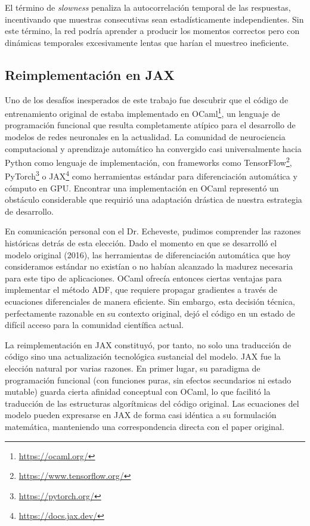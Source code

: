 El término de \textit{slowness} penaliza la autocorrelación temporal de las respuestas, incentivando que muestras consecutivas sean estadísticamente independientes. Sin este término, la red podría aprender a producir los momentos correctos pero con dinámicas temporales excesivamente lentas que harían el muestreo ineficiente.

\subsection{Reimplementación en JAX}
\label{subsec:impl_jax}

Uno de los desafíos inesperados de este trabajo fue descubrir que el código de entrenamiento original de \citet{echeveste2020cortical} estaba implementado en OCaml\footnote{\url{https://ocaml.org/}}, un lenguaje de programación funcional que resulta completamente atípico para el desarrollo de modelos de redes neuronales en la actualidad. La comunidad de neurociencia computacional y aprendizaje automático ha convergido casi universalmente hacia Python como lenguaje de implementación, con frameworks como TensorFlow\footnote{\url{https://www.tensorflow.org/}}, PyTorch\footnote{\url{https://pytorch.org/}} o JAX\footnote{\url{https://docs.jax.dev/}} como herramientas estándar para diferenciación automática y cómputo en \acrshort{GPU}. Encontrar una implementación en OCaml representó un obstáculo considerable que requirió una adaptación drástica de nuestra estrategia de desarrollo.

En comunicación personal con el Dr. Echeveste, pudimos comprender las razones históricas detrás de esta elección. Dado el momento en que se desarrolló el modelo original (2016), las herramientas de diferenciación automática que hoy consideramos estándar no existían o no habían alcanzado la madurez necesaria para este tipo de aplicaciones. OCaml ofrecía entonces ciertas ventajas para implementar el método \acrshort{ADF}, que requiere propagar gradientes a través de ecuaciones diferenciales de manera eficiente. Sin embargo, esta decisión técnica, perfectamente razonable en su contexto original, dejó el código en un estado de difícil acceso para la comunidad científica actual.

La reimplementación en JAX constituyó, por tanto, no solo una traducción de código sino una actualización tecnológica sustancial del modelo. JAX fue la elección natural por varias razones. En primer lugar, su paradigma de programación funcional (con funciones puras, sin efectos secundarios ni estado mutable) guarda cierta afinidad conceptual con OCaml, lo que facilitó la traducción de las estructuras algorítmicas del código original. Las ecuaciones del modelo pueden expresarse en JAX de forma casi idéntica a su formulación matemática, manteniendo una correspondencia directa con el paper original.

